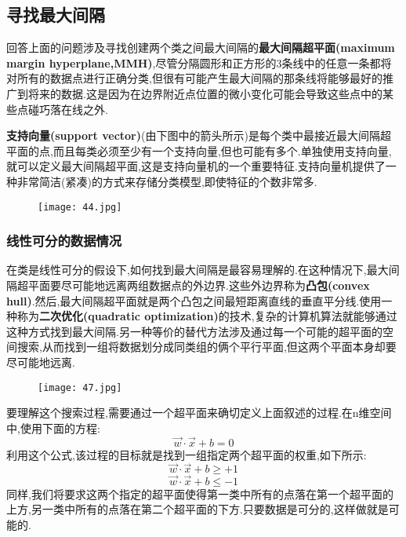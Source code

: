 \documentclass[11pt,a4paper,oneside]{book}
\begin{document}
\subsection{寻找最大间隔}
回答上面的问题涉及寻找创建两个类之间最大间隔的\textbf{最大间隔超平面(maximum margin hyperplane,MMH)},尽管分隔圆形和正方形的3条线中的任意一条都将对所有的数据点进行正确分类,但很有可能产生最大间隔的那条线将能够最好的推广到将来的数据.这是因为在边界附近点位置的微小变化可能会导致这些点中的某些点碰巧落在线之外.

\textbf{支持向量(support vector)}(由下图中的箭头所示)是每个类中最接近最大间隔超平面的点,而且每类必须至少有一个支持向量,但也可能有多个.单独使用支持向量,就可以定义最大间隔超平面,这是支持向量机的一个重要特征.支持向量机提供了一种非常简洁(紧凑)的方式来存储分类模型,即使特征的个数非常多.
\begin{figure}[H]
	\centering
	\texttt{[image: 44.jpg]}
\end{figure}

\subsubsection{线性可分的数据情况}
在类是线性可分的假设下,如何找到最大间隔是最容易理解的.在这种情况下,最大间隔超平面要尽可能地远离两组数据点的外边界.这些外边界称为\textbf{凸包(convex hull)}.然后,最大间隔超平面就是两个凸包之间最短距离直线的垂直平分线.使用一种称为\textbf{二次优化(quadratic optimization)}的技术,复杂的计算机算法就能够通过这种方式找到最大间隔.另一种等价的替代方法涉及通过每一个可能的超平面的空间搜索,从而找到一组将数据划分成同类组的俩个平行平面,但这两个平面本身却要尽可能地远离.
\begin{figure}[H]
	\centering
	\texttt{[image: 47.jpg]}
\end{figure}
要理解这个搜索过程,需要通过一个超平面来确切定义上面叙述的过程.在n维空间中,使用下面的方程:
\begin{equation}
\vec{w}\cdot\vec{x}+b=0
\end{equation}
利用这个公式,该过程的目标就是找到一组指定两个超平面的权重,如下所示:
\begin{equation}
	\vec{w}\cdot\vec{x}+b\geq+1
\end{equation}
\begin{equation}
	\vec{w}\cdot\vec{x}+b\leq-1
\end{equation}
同样,我们将要求这两个指定的超平面使得第一类中所有的点落在第一个超平面的上方,另一类中所有的点落在第二个超平面的下方.只要数据是可分的,这样做就是可能的.
\end{document}
